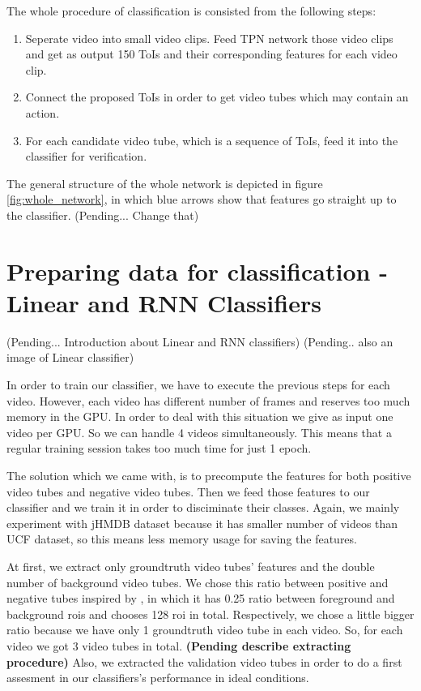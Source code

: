 \documentclass{report}
\begin{document}
The whole procedure of classification is consisted from the following steps:
\begin{enumerate}
\item Seperate video into small video clips. Feed TPN network those video clips and get as output
  150 ToIs and their corresponding features for each video clip.
\item Connect the proposed ToIs in order to get video tubes which may contain an action.
\item For each candidate video tube, which is a sequence of ToIs, feed it into the classifier
  for verification.
\end{enumerate}

The general structure of the whole network is depicted in figure \ref{fig:whole_network}, in which blue arrows show that
features go straight up to the classifier. (Pending... Change that)


\section{Preparing data for classification - Linear and RNN Classifiers}
(Pending... Introduction about Linear and RNN classifiers)
(Pending.. also an image of Linear classifier)

  

In order to train our classifier, we have to execute the previous steps for each video. However, each video
has different number of frames and reserves too much memory in the GPU. In order to deal with this situation
we give as input one video per GPU. So we can handle 4 videos simultaneously. This means that a regular
training session takes too much time for just 1 epoch. \par
The solution which we came with, is to precompute the features for both positive video tubes and negative video tubes.
Then we feed those features to our classifier and we train it in order to disciminate their classes.
Again, we mainly experiment with jHMDB dataset because it has smaller number of videos than UCF dataset, so this means
less memory usage for saving the features.\par
At first, we extract only groundtruth video tubes' features and the double number of background video tubes. We chose this
ratio between positive and negative tubes inspired by \cite{jjfaster2rcnn}, in which it has 0.25 ratio between foreground
and background rois and chooses 128 roi in total. Respectively, we chose a little bigger ratio because we have only 1 groundtruth
video tube in each video. So, for each video we got 3 video tubes in total.
\textbf{(Pending describe extracting procedure)}
Also, we extracted the validation video tubes in order to do a first assesment in our classifiers's performance in ideal conditions. 
\end{document}
